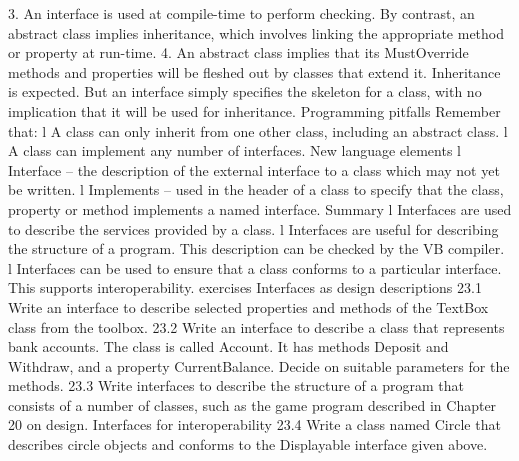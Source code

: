 3.	An interface is used at compile-time to perform checking. By contrast, an abstract class implies inheritance, which involves linking the appropriate method or property at run-time.
4.	An abstract class implies that its MustOverride methods and properties will be ﬂeshed out by classes that extend it. Inheritance is expected. But an interface simply speciﬁes the skeleton for a class, with no implication that it will be used 
for inheritance.
Programming pitfalls
Remember that:
l	A class can only inherit from one other class, including an abstract class.
l	A class can implement any number of interfaces.
New language elements
l	Interface – the description of the external interface to a class which may not yet be written.
l	Implements – used in the header of a class to specify that the class, property or method implements a named interface.
Summary
l	Interfaces are used to describe the services provided by a class.
l	Interfaces are useful for describing the structure of a program. This description can be checked by the VB compiler.
l	Interfaces can be used to ensure that a class conforms to a particular interface. This supports interoperability.
exercises
Interfaces as design descriptions
23.1	Write an interface to describe selected properties and methods of the TextBox class from the toolbox.
23.2	Write an interface to describe a class that represents bank accounts. The class 
is called Account. It has methods Deposit and Withdraw, and a property CurrentBalance. Decide on suitable parameters for the methods.
23.3	Write interfaces to describe the structure of a program that consists of a number of classes, such as the game program described in Chapter 20 on design.
Interfaces for interoperability
23.4	Write a class named Circle that describes circle objects and conforms to the Displayable interface given above.

